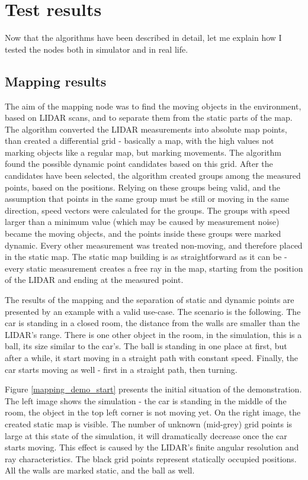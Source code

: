 \chapter{Test results}
\label{chap:test_results}

Now that the algorithms have been described in detail, let me explain how I tested the nodes both in simulator and in real life.

\section{Mapping results}
The aim of the mapping node was to find the moving objects in the environment, based on LIDAR scans, and to separate them from the static parts of the map. The algorithm converted the LIDAR measurements into absolute map points, than created a differential grid - basically a map, with the high values not marking objects like a regular map, but marking movements. The algorithm found the possible dynamic point candidates based on this grid. After the candidates have been selected, the algorithm created groups among the measured points, based on the positions. Relying on these groups being valid, and the assumption that points in the same group must be still or moving in the same direction, speed vectors were calculated for the groups. The groups with speed larger than a minimum value (which may be caused by measurement noise) became the moving objects, and the points inside these groups were marked dynamic. Every other measurement was treated non-moving, and therefore placed in the static map. The static map building is as straightforward as it can be - every static measurement creates a free ray in the map, starting from the position of the LIDAR and ending at the measured point.

The results of the mapping and the separation of static and dynamic points are presented by an example with a valid use-case. The scenario is the following. The car is standing in a closed room, the distance from the walls are smaller than the LIDAR's range. There is one other object in the room, in the simulation, this is a ball, its size similar to the car's. The ball is standing in one place at first, but after a while, it start moving in a straight path with constant speed. Finally, the car starts moving as well - first in a straight path, then turning.

Figure \ref{mapping_demo_start} presents the initial situation of the demonstration. The left image shows the simulation - the car is standing in the middle of the room, the object in the top left corner is not moving yet. On the right image, the created static map is visible. The number of unknown (mid-grey) grid points is large at this state of the simulation, it will dramatically decrease once the car starts moving. This effect is caused by the LIDAR's finite angular resolution and ray characteristics. The black grid points represent statically occupied positions. All the walls are marked static, and the ball as well.

